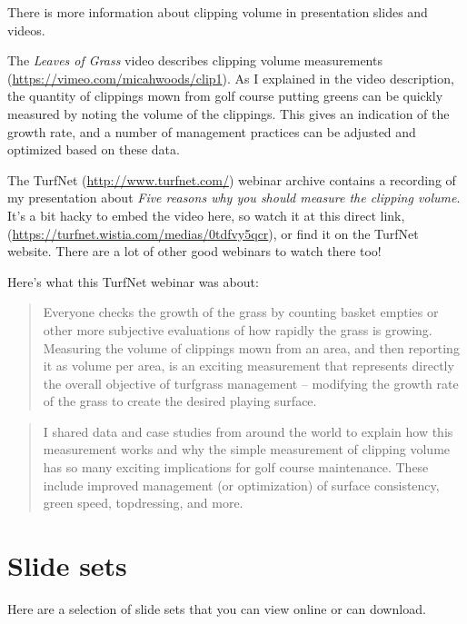 \documentclass[12pt,b5,]{tufte-book}
\begin{document}
There is more information about clipping volume in presentation slides and videos.

The \emph{Leaves of Grass} video describes clipping volume measurements (\url{https://vimeo.com/micahwoods/clip1}). As I explained in the video description, the quantity of clippings mown from golf course putting greens can be quickly measured by noting the volume of the clippings. This gives an indication of the growth rate, and a number of management practices can be adjusted and optimized based on these data.

The TurfNet (\url{http://www.turfnet.com/}) webinar archive contains a recording of my presentation about \emph{Five reasons why you should measure the clipping volume}. It's a bit hacky to embed the video here, so watch it at this direct link, (\url{https://turfnet.wistia.com/medias/0tdfvy5qcr}), or find it on the TurfNet website. There are a lot of other good webinars to watch there too!

Here's what this TurfNet webinar was about:

\begin{quote}
Everyone checks the growth of the grass by counting basket empties or other more subjective evaluations of how rapidly the grass is growing. Measuring the volume of clippings mown from an area, and then reporting it as volume per area, is an exciting measurement that represents directly the overall objective of turfgrass management -- modifying the growth rate of the grass to create the desired playing surface.
\end{quote}

\begin{quote}
I shared data and case studies from around the world to explain how this measurement works and why the simple measurement of clipping volume has so many exciting implications for golf course maintenance. These include improved management (or optimization) of surface consistency, green speed, topdressing, and more.
\end{quote}

\hypertarget{slide-sets}{%
\section{Slide sets}\label{slide-sets}}

Here are a selection of slide sets that you can view online or can download.
\end{document}
